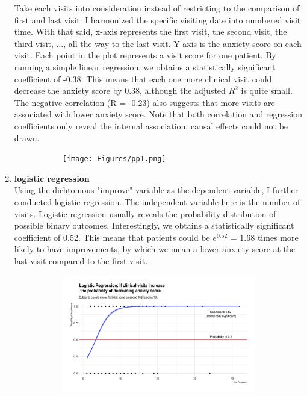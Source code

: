 \documentclass[11pt]{article}
\begin{document}
\begin{enumerate}
	Take each visits into consideration instead of restricting to the comparison of first and last visit. I harmonized the specific visiting date into numbered visit time. With that said, x-axis represents the first visit, the second visit, the third visit, ..., all the way to the last visit. Y axis is the anxiety score on each visit. Each point in the plot represents a visit score for one patient. By running a simple linear regression, we obtains a statistically significant coefficient of -0.38. This means that each one more clinical visit could decrease the anxiety score by 0.38, although the adjusted $R^2$ is quite small. The negative correlation (R = -0.23) also suggests that more visits are associated with lower anxiety score. Note that both correlation and regression coefficients only reveal the internal association, causal effects could not be drawn.
	
	 \begin{figure}[htb!]
		\caption{Linear regression}\label{fig:picture4}
		\centering
		\begin{subfigure}[h]{0.48\linewidth}
			\texttt{[image: Figures/pp1.png]}
			\caption{}\label{fig:pp1}
		\end{subfigure}
	\end{figure}

	\item \textbf{logistic regression}\\
	
	Using the dichtomous "improve" variable as the dependent variable, I further conducted logistic regression. The independent variable here is the number of visits. Logistic regression usually reveals the probability distribution of possible binary outcomes. Interestingly, we obtains a statistically significant coefficient of 0.52. This means that patients could be $e^{0.52}$ = 1.68 times more likely to have improvements, by which we mean a lower anxiety score at the last-visit compared to the first-visit.

	 \begin{figure}[htb!]
		\caption{Logistic regression}\label{fig:picture5}
		\centering
		\begin{subfigure}[h]{0.48\linewidth}
			\includegraphics[width=\linewidth]{Figures/pp2.png}
			\caption{}\label{fig:pp2}
		\end{subfigure}
	\end{figure}

\end{enumerate}
\end{document}
